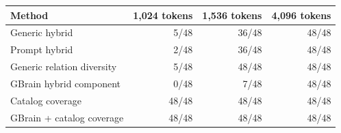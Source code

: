 \begin{tabular}{lrrr}
\toprule
Method & 1,024 tokens & 1,536 tokens & 4,096 tokens \\
\midrule
Generic hybrid & 5/48 & 36/48 & 48/48 \\
Prompt hybrid & 2/48 & 36/48 & 48/48 \\
Generic relation diversity & 5/48 & 48/48 & 48/48 \\
GBrain hybrid component & 0/48 & 7/48 & 48/48 \\
Catalog coverage & 48/48 & 48/48 & 48/48 \\
GBrain + catalog coverage & 48/48 & 48/48 & 48/48 \\
\bottomrule
\end{tabular}
